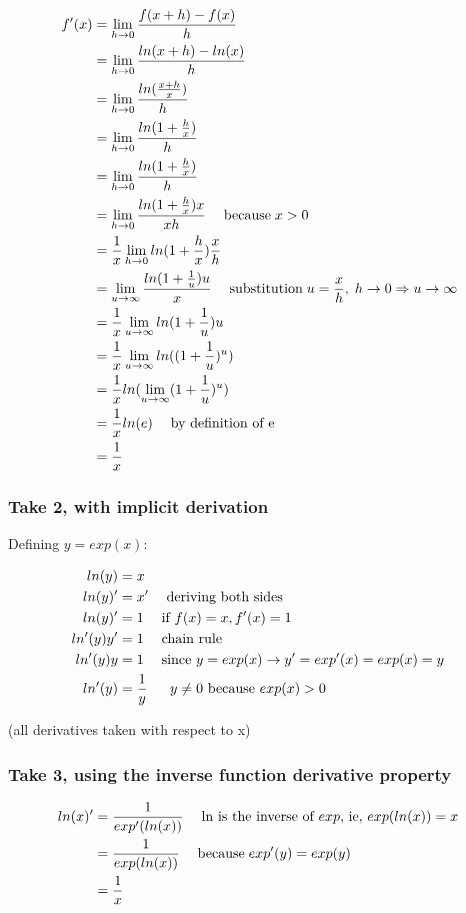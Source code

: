 \begin{align*}
f'(x)&=\derDefinition
\\&= \derLimit{ln(x+h)-ln(x)}{h}
\\&= \derLimit{ln( \frac{x+h}{x})}{h}
\\&= \derLimit{ln(1+ \frac{h}{x} )}{h}
\\&= \derLimit{ln(1+ \frac{h}{x})}{h}
\\&= \derLimit{ln(1+ \frac{h}{x}) x }{x h}  \mathcomment{because} x>0
\\&= \inv{x} \mylim{h}{0}{ln(1+ \frac{h}{x}) \frac{x}{h} }
\\&= \mylim{u}{\infty}{ \frac{ln(1+ \inv{u}) u}{x}  }  \mathcomment{substitution} u=\frac{x}{h}, \; h \rightarrow 0 \Rightarrow u \rightarrow \infty
\\&= \inv{x} \mylim{u}{\infty}{ ln(1+ \inv{u}) u }
\\&= \inv{x} \mylim{u}{\infty}{ ln( (1+ \inv{u})^u ) }
\\&= \inv{x} ln(\mylim{u}{\infty}{  (1+ \inv{u})^u })
\\&= \inv{x} ln(e) \mathcomment{by definition of e}
\\&= \inv{x}
\end{align*}

\subsubsection{Take 2, with implicit derivation}

Defining $y=exp(x)$:

\begin{align*}
ln(y)&=x
\\ ln(y)'&=x' \mathcomment{deriving both sides}
\\ ln(y)'&=1 \mathcomment{if $f(x)=x, f'(x)=1$}
\\ ln'(y) y'&=1 \mathcomment{chain rule}
\\ ln'(y) y &=1 \mathcomment{since $y=exp(x) \rightarrow y'=exp'(x)=exp(x)=y$}
\\ ln'(y) &=\inv{y} \mathcomment{ $y \neq 0$ because $exp(x)>0$}
\end{align*}

(all derivatives taken with respect to x)

\subsubsection{Take 3, using the inverse function derivative property}
\begin{align*}
ln(x)' &= \inv{ exp'(ln(x))} \mathcomment{$\ln$ is the inverse of $exp$, ie, $exp(ln(x))=x$}
\\ &= \inv{exp(ln(x))}  \mathcomment{because} exp'(y)=exp(y)
\\ &= \inv{x}
\end{align*}

